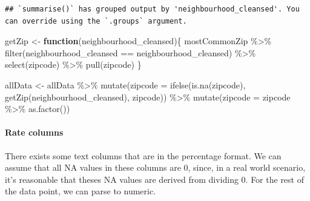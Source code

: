 \documentclass[
]{article}
\newenvironment{Shaded}{\begin{snugshade}}{\end{snugshade}}
\newcommand{\AttributeTok}[1]{\textcolor[rgb]{0.77,0.63,0.00}{#1}}
\newcommand{\ControlFlowTok}[1]{\textcolor[rgb]{0.13,0.29,0.53}{\textbf{#1}}}
\newcommand{\FunctionTok}[1]{\textcolor[rgb]{0.00,0.00,0.00}{#1}}
\newcommand{\NormalTok}[1]{#1}
\newcommand{\OtherTok}[1]{\textcolor[rgb]{0.56,0.35,0.01}{#1}}
\newcommand{\SpecialCharTok}[1]{\textcolor[rgb]{0.00,0.00,0.00}{#1}}
\begin{document}
\begin{verbatim}
## `summarise()` has grouped output by 'neighbourhood_cleansed'. You can override using the `.groups` argument.
\end{verbatim}

\begin{Shaded}
\begin{Highlighting}[]
\NormalTok{getZip }\OtherTok{\textless{}{-}} \ControlFlowTok{function}\NormalTok{(neighbourhood\_cleansed)\{}
\NormalTok{  mostCommonZip }\SpecialCharTok{\%\textgreater{}\%} \FunctionTok{filter}\NormalTok{(neighbourhood\_cleansed }\SpecialCharTok{==}\NormalTok{ neighbourhood\_cleansed) }\SpecialCharTok{\%\textgreater{}\%} \FunctionTok{select}\NormalTok{(zipcode) }\SpecialCharTok{\%\textgreater{}\%} \FunctionTok{pull}\NormalTok{(zipcode)}
\NormalTok{\}}

\NormalTok{allData }\OtherTok{\textless{}{-}}\NormalTok{ allData }\SpecialCharTok{\%\textgreater{}\%} \FunctionTok{mutate}\NormalTok{(}\AttributeTok{zipcode =} \FunctionTok{ifelse}\NormalTok{(}\FunctionTok{is.na}\NormalTok{(zipcode), }\FunctionTok{getZip}\NormalTok{(neighbourhood\_cleansed), zipcode)) }\SpecialCharTok{\%\textgreater{}\%} \FunctionTok{mutate}\NormalTok{(}\AttributeTok{zipcode =}\NormalTok{ zipcode }\SpecialCharTok{\%\textgreater{}\%} \FunctionTok{as.factor}\NormalTok{())}
\end{Highlighting}
\end{Shaded}

\hypertarget{rate-columns}{%
\paragraph{Rate columns}\label{rate-columns}}

There exists some text columns that are in the percentage format. We can
assume that all NA values in these columns are 0, since, in a real world
scenario, it's reasonable that theses NA values are derived from
dividing 0. For the rest of the data point, we can parse to numeric.
\end{document}

